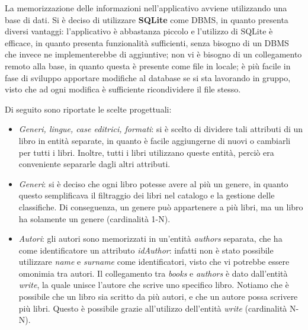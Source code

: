 \documentclass[a4paper,11pt]{report}
\begin{document}
La memorizzazione delle informazioni nell'applicativo avviene utilizzando una base di dati. Si è deciso di utilizzare \textbf{SQLite} come DBMS, in quanto presenta diversi vantaggi: l'applicativo è abbastanza piccolo e l'utilizzo di SQLite è efficace, in quanto presenta funzionalità sufficienti, senza bisogno di un DBMS che invece ne implementerebbe di aggiuntive; non vi è bisogno di un collegamento remoto alla base, in quanto questa è presente come file in locale; è più facile in fase di sviluppo apportare modifiche al database se si sta lavorando in gruppo, visto che ad ogni modifica è sufficiente ricondividere il file stesso.

Di seguito sono riportate le scelte progettuali:
\begin{itemize}
    \item \textit{Generi, lingue, case editrici, formati}: si è scelto di dividere tali attributi di un libro in entità separate, in quanto è facile aggiungerne di nuovi o cambiarli per tutti i libri. Inoltre, tutti i libri utilizzano queste entità, perciò era conveniente separarle dagli altri attributi.
    
    \item \textit{Generi}: si è deciso che ogni libro potesse avere al più un genere, in quanto questo semplificava il filtraggio dei libri nel catalogo e la gestione delle classifiche. Di conseguenza, un genere può appartenere a più libri, ma un libro ha solamente un genere (cardinalità 1-N).
  
    \item \textit{Autori}: gli autori sono memorizzati in un'entità \textit{authors} separata, che ha come identificatore un attributo \textit{idAuthor}: infatti non è stato possibile utilizzare \textit{name} e \textit{surname} come identificatori, visto che vi potrebbe essere omonimia tra autori. 
    \newline
    Il collegamento tra \textit{books} e \textit{authors} è dato dall'entità \textit{write}, la quale unisce l'autore che scrive uno specifico libro. Notiamo che è possibile che un libro sia scritto da più autori, e che un autore possa scrivere più libri. Questo è possibile grazie all'utilizzo dell'entità \textit{write} (cardinalità N-N).
  

\end{itemize}
\end{document}
